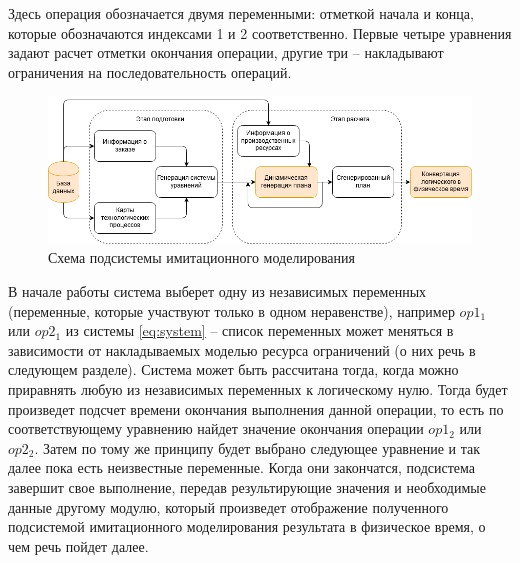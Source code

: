 \indent Здесь операция обозначается двумя переменными: отметкой начала и конца, которые обозначаются индексами 1 и 2 соответственно.
Первые четыре уравнения задают расчет отметки окончания операции, другие три -- накладывают ограничения на последовательность операций.

\begin{figure}[ht]
	\centering
	\includegraphics[width=\linewidth]{pics/imcoreDataflow.png}
	\caption{Схема подсистемы имитационного моделирования}
	\label{fig:imcoreFlow}
\end{figure}

\indent В начале работы система выберет одну из независимых переменных (переменные, которые участвуют только в одном неравенстве), например $op1_1$ или $op2_1$ из системы \ref{eq:system} -- список переменных может меняться в зависимости от накладываемых моделью ресурса ограничений (о них речь в следующем разделе).
Система может быть рассчитана тогда, когда можно приравнять любую из независимых переменных к логическому нулю.
Тогда будет произведет подсчет времени окончания выполнения данной операции, то есть по соответствующему уравнению найдет значение окончания операции $op1_2$ или $op2_2$.
Затем по тому же принципу будет выбрано следующее уравнение и так далее пока есть неизвестные переменные.
Когда они закончатся, подсистема завершит свое выполнение, передав результирующие значения и необходимые данные другому модулю, который произведет отображение полученного подсистемой имитационного моделирования результата в физическое время, о чем речь пойдет далее.
